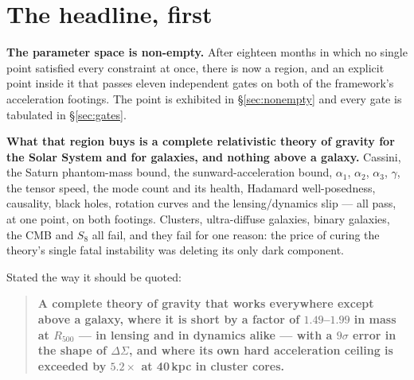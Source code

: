 \documentclass[11pt,letterpaper]{article}
\begin{document}
\begin{abstract}
quoted; in each case the direction survives and only the number falls. The relation $a_0=\kappa c\sqrt{G\rho_\Lambda}$ is fitted, not derived \cite{z22559892}: $\kappa=0.4998$ canonical and $0.6023$ alt, so the tie does not even select a footing. Distinctive predictions are stated with numbers and falsifiers, among them a parameter-free ceiling on the acceleration excess and a deep-MOND baryonic Tully--Fisher zero point flat to better than $1\%$ out to $z=5$. Every number is produced by a committed script with checks that can fail (\texttt{fable\_independent\_2026/L43\_assemble\_theory.py} and its supporting lanes in the public repository). AI-assisted research draft; not peer reviewed.
\end{abstract}

\section{The headline, first}
\textbf{The parameter space is non-empty.} After eighteen months in which no single point satisfied every constraint at once, there is now a region, and an explicit point inside it that passes eleven independent gates on both of the framework's acceleration footings. The point is exhibited in \S\ref{sec:nonempty} and every gate is tabulated in \S\ref{sec:gates}.

\textbf{What that region buys is a complete relativistic theory of gravity for the Solar System and for galaxies, and nothing above a galaxy.} Cassini, the Saturn phantom-mass bound, the sunward-acceleration bound, $\alpha_1$, $\alpha_2$, $\alpha_3$, $\gamma$, the tensor speed, the mode count and its health, Hadamard well-posedness, causality, black holes, rotation curves and the lensing/dynamics slip --- all pass, at one point, on both footings. Clusters, ultra-diffuse galaxies, binary galaxies, the CMB and $S_8$ all fail, and they fail for one reason: the price of curing the theory's single fatal instability was deleting its only dark component.

Stated the way it should be quoted:

\begin{quote}
\textbf{A complete theory of gravity that works everywhere except above a galaxy, where it is short by a factor of $1.49$--$1.99$ in mass at $R_{500}$ --- in lensing and in dynamics alike --- with a $9\sigma$ error in the shape of $\Delta\Sigma$, and where its own hard acceleration ceiling is exceeded by $5.2\times$ at 40\,kpc in cluster cores.}
\end{quote}
\end{document}
